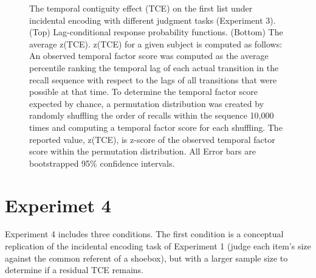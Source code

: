 \documentclass[man,natbib,floatsintext]{apa6} %
\begin{document}
  


\color{black}

\begin{figure}%
\caption{The temporal contiguity effect (TCE) on the first list under incidental encoding with different judgment tasks (Experiment 3). (Top) Lag-conditional response probability functions. (Bottom) The average z(TCE). z(TCE) for a given subject is computed as follows: An observed temporal factor score was computed as the average percentile ranking the temporal lag of each actual transition in the recall sequence with respect to the lags of all transitions that were possible at that time. To determine the temporal factor score expected by chance, a permutation distribution was created by randomly shuffling the order of recalls within the sequence 10,000 times and computing a temporal factor score for each shuffling. The reported value, z(TCE), is z-score of the observed temporal factor score within the permutation distribution. All Error bars are bootstrapped 95\% confidence intervals.}
\label{e3_l1_crp}
\end{figure}


\color{red}
\section{Experimet 4}
\label{newexp}





Experiment 4 includes three conditions. The first condition is a conceptual replication of the incidental encoding task of Experiment 1 (judge each item's size against the common referent of a shoebox), but with a larger sample size to determine if a residual TCE remains. 
\end{document}
